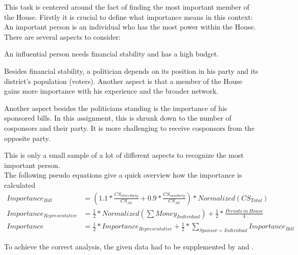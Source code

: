 \begin{homeworkProblem}
  This task is centered around the fact of finding the most important member of the House. Firstly it is crucial to define what importance means in this context:\\

  An important person is an individual who has the most power within the House. There are several aspects to consider:
  \begin{description}[labelindent=1cm]
    \item[Money] An influential person needs financial stability and has a high budget.
    \item[Reelections] Besides financial stability, a politician depends on its position in his party and its district's population (voters). Another aspect is that a member of the House gains more importance with his experience and the broader network.
    \item[Bills] Another aspect besides the politicians standing is the importance of his sponsored bills. In this assignment, this is shrunk down to the number of cosponsors and their party. It is more challenging to receive cosponsors from the opposite party.
  \end{description}
  This is only a small sample of a lot of different aspects to recognize the most important person.\\

  The following pseudo equations give a quick overview how the importance is calculated
      \begin{align}
      Importance_{Bill} & = (1.1 * \frac{CS_{other Party}}{CS_{All}} + 0.9 * \frac{CS_{own Party}}{CS_{All}}) * Normalized(CS_{Total}) \\
      Importance_{Representative} & =  \frac{1}{2} * Normalized(\sum Money_{Individual}) + \frac{1}{2} * \frac{Periods~in~House}{4}\\
      Importance & = \frac{1}{2} * Importance_{Representative} + \frac{1}{2} * \sum_{Sponsor = Individual} Importance_{Bill}
    \end{align}

To achieve the correct analysis, the given data had to be supplemented by \cite{ProPublica:bills} and \cite{ProPublica:expenses}.

\end{homeworkProblem}

\newpage
{}
\printbibliography

